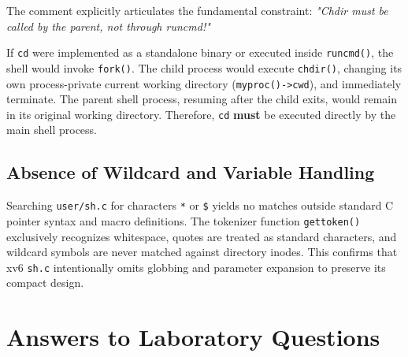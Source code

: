 \documentclass[12pt,a4paper]{article}
\begin{document}
The comment explicitly articulates the fundamental constraint: \textit{"Chdir must be called by the parent, not through runcmd!"}

If \texttt{cd} were implemented as a standalone binary or executed inside \texttt{runcmd()}, the shell would invoke \texttt{fork()}. The child process would execute \texttt{chdir()}, changing its own process-private current working directory (\texttt{myproc()->cwd}), and immediately terminate. The parent shell process, resuming after the child exits, would remain in its original working directory. Therefore, \texttt{cd} \textbf{must} be executed directly by the main shell process.

\subsection{Absence of Wildcard and Variable Handling}
Searching \texttt{user/sh.c} for characters \texttt{*} or \texttt{\$} yields no matches outside standard C pointer syntax and macro definitions. The tokenizer function \texttt{gettoken()} exclusively recognizes whitespace, quotes are treated as standard characters, and wildcard symbols are never matched against directory inodes. This confirms that xv6 \texttt{sh.c} intentionally omits globbing and parameter expansion to preserve its compact design.

\section{Answers to Laboratory Questions}
\end{document}
